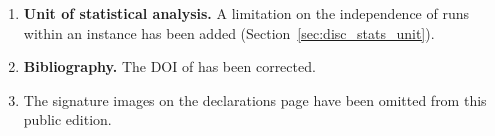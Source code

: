 \documentclass[12pt, a4paper, oneside]{report}
\begin{document}
\begin{enumerate}
not match the final runs and have been replaced with the values
measured across all Sprint runs at optimal $L_c$ (1.18, 9.02 and 5.70
percent), together with the measured number of iterations per bound
update.
\item \textbf{Unit of statistical analysis.} A limitation on the
independence of runs within an instance has been added
(Section~\ref{sec:disc_stats_unit}).
\item \textbf{Bibliography.} The DOI of \citet{Bykov2016} has been
corrected.
\item The signature images on the declarations page have been
omitted from this public edition.
\end{enumerate}


\end{document}
